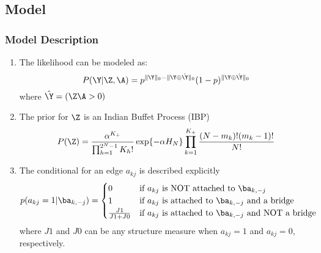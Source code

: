 \documentclass{beamer}
\begin{document}
\subsection{Model}
\begin{frame}
\frametitle{Model Description}
\fontsize{6pt}{7.2}\selectfont

\begin{enumerate}
	\item The likelihood can be modeled as:
$$ P(\Y|\Z,\A) = p^{\|\Y\|_0 - \|\Y \oplus \hat\Y\|_0} (1-p)^{\|\Y \oplus \hat\Y\|_0} $$ where $\hat\Y = (\Z\A>0)$

	\item The prior for $\Z$ is an Indian Buffet Process (IBP) $$ P(\Z) = \frac{\alpha^{K_+}}{\prod_{h=1}^{2^N-1}K_h!}\exp\{-\alpha H_N\}\prod_{k=1}^{K_+}\frac{(N-m_k)!(m_k-1)!}{N!} $$

	\item The conditional for an edge $a_{kj}$ is described explicitly 
\begin{equation*}
		p(a_{kj}=1|\ba_{k,-j}) = \begin{cases}			
			0 & \text{if}\  a_{kj}\  \text{is NOT attached to $\ba_{k,-j}$} \\
			1 & \text{if}\  a_{kj}\  \text{is attached to $\ba_{k,-j}$ and a bridge} \\
			\frac{J1}{J1+J0} & \text{if $a_{kj}$ is attached to $\ba_{k,-j}$ and NOT a bridge} \\
		\end{cases}		
\end{equation*}
where $J1$ and $J0$ can be any structure measure when $a_{kj}=1$ and $a_{kj}=0$, respectively.
\end{enumerate}

\end{frame}
\end{document}
